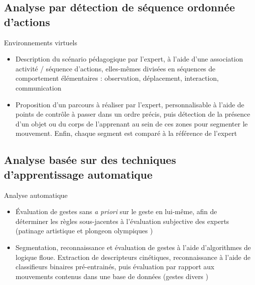     \subsection{Analyse par détection de séquence ordonnée d'actions}
    \begin{frame}{\subsecname}
        \begin{block}{Environnements virtuels}
            \begin{itemize}[label=$\bullet$]
                \item Description du scénario pédagogique par l'expert, à l'aide d'une association activité / séquence d'actions, elles-mêmes divisées en séquences de comportement élémentaires : observation, déplacement, interaction, communication        
                \item Proposition d'un parcours à réaliser par l'expert, personnalisable à l'aide de points de contrôle à passer dans un ordre précis, puis détection de la présence d'un objet ou du corps de l'apprenant au sein de ces zones pour segmenter le mouvement. Enfin, chaque segment est comparé à la référence de l'expert 
            \end{itemize}
        \end{block}
    \end{frame}
    
    \subsection{Analyse basée sur des techniques d'apprentissage automatique}
    \begin{frame}{\subsecname}
        \begin{block}{Analyse automatique}
            \begin{itemize}[label=$\bullet$]
                \item Évaluation de gestes sans \textit{a priori} sur le geste en lui-même, afin de déterminer les règles sous-jacentes à l'évaluation subjective des experts (patinage artistique et plongeon olympiques )
                \item Segmentation, reconnaissance et évaluation de gestes à l'aide d'algorithmes de logique floue. Extraction de descripteurs cinétiques, reconnaissance à l'aide de classifieurs binaires pré-entrainés, puis évaluation par rapport aux mouvements contenus dans une base de données (gestes divers )
            \end{itemize}
        \end{block}
    \end{frame}
    
